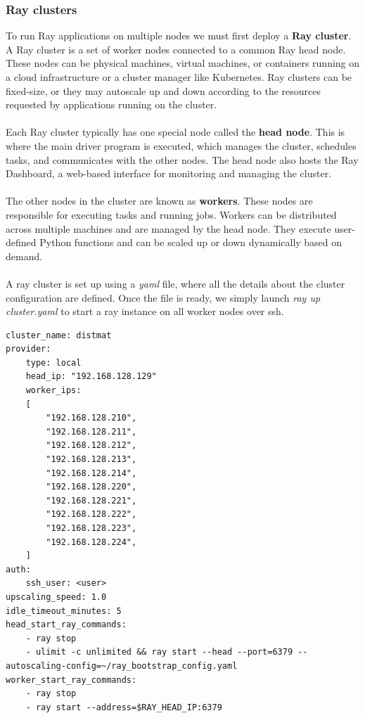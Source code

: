\subsubsection{Ray clusters}
To run Ray applications on multiple nodes we must first deploy a \textbf{Ray cluster}. A Ray cluster is a set of worker nodes connected to a common Ray head node. These nodes can be physical machines, virtual machines, or containers running on a cloud infrastructure or a cluster manager like Kubernetes. Ray clusters can be fixed-size, or they may autoscale up and down according to the resources requested by applications running on the cluster.
\\\\
Each Ray cluster typically has one special node called the \textbf{head node}. This is where the main driver program is executed, which manages the cluster, schedules tasks, and communicates with the other nodes. The head node also hosts the Ray Dashboard, a web-based interface for monitoring and managing the cluster.
\\\\
The other nodes in the cluster are known as \textbf{workers}. These nodes are responsible for executing tasks and running jobs. Workers can be distributed across multiple machines and are managed by the head node. They execute user-defined Python functions and can be scaled up or down dynamically based on demand.
\\\\
A ray cluster is set up using a \textit{yaml} file, where all the details about the cluster configuration are defined. Once the file is ready, we simply launch \textit{ray up cluster.yaml} to start a ray instance on all worker nodes over ssh.
\begin{lstlisting}[caption={cluster.yaml}]
cluster_name: distmat
provider:
    type: local
    head_ip: "192.168.128.129"
    worker_ips:
    [
        "192.168.128.210",
        "192.168.128.211",
        "192.168.128.212",
        "192.168.128.213",
        "192.168.128.214",
        "192.168.128.220",
        "192.168.128.221",
        "192.168.128.222",
        "192.168.128.223",
        "192.168.128.224",
    ]
auth:
    ssh_user: <user>
upscaling_speed: 1.0
idle_timeout_minutes: 5
head_start_ray_commands:
    - ray stop
    - ulimit -c unlimited && ray start --head --port=6379 --autoscaling-config=~/ray_bootstrap_config.yaml
worker_start_ray_commands:
    - ray stop
    - ray start --address=$RAY_HEAD_IP:6379
\end{lstlisting}
\pagebreak

